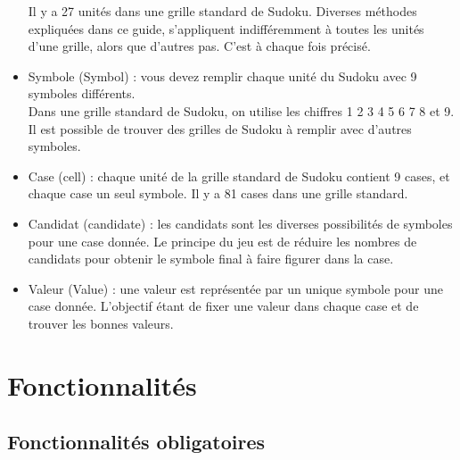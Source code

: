 \begin{itemize}
  Il y a 27 unités dans une grille standard de Sudoku.
  Diverses méthodes expliquées dans ce guide, s'appliquent indifféremment à toutes les 
  unités d'une grille, alors que d'autres pas. C'est à chaque fois précisé. \\

  \item Symbole (Symbol) :
  vous devez remplir chaque unité du Sudoku avec 9 symboles différents.  \\
 
  Dans une grille standard de Sudoku, on utilise les chiffres 1 2 3 4 5 6 7 8 et 9. 
  Il est possible de trouver des grilles de Sudoku à remplir avec d'autres symboles.  \\

  \item Case (cell) :
  chaque unité de la grille standard de Sudoku contient 9 cases, et chaque case un seul 
  symbole. Il y a 81 cases dans une grille standard. \\

  \item Candidat (candidate) :
  les candidats sont les diverses possibilités de symboles pour une case donnée. 
  Le principe du jeu est de réduire les nombres de candidats pour obtenir le symbole 
  final à faire figurer dans la case.\\
  
  \item Valeur (Value) : 
  une valeur est représentée par un unique symbole pour une case donnée.
  L'objectif étant de fixer une valeur dans chaque case et de trouver les bonnes valeurs.
  
\end{itemize}

\section{Fonctionnalités}

\subsection{Fonctionnalités obligatoires}

